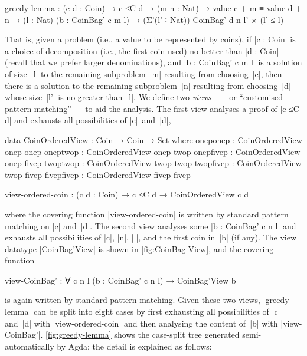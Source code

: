 \begin{code}greedy-lemma :
  (c d : Coin) → c ≤C d →
  (m n : Nat) → value c + m ≡ value d + n →
  (l : Nat) (b : CoinBag' c m l) →
  (Σ'(l' ∶ Nat)) CoinBag' d n l' × (l' ≤ l)
\end{code}That is, given a problem (i.e., a value to be represented by coins), if |c : Coin| is a choice of decomposition (i.e., the first coin used) no better than |d : Coin| (recall that we prefer larger denominations), and |b : CoinBag' c m l| is a solution of size~|l| to the remaining subproblem~|m| resulting from choosing~|c|, then there is a solution to the remaining subproblem~|n| resulting from choosing~|d| whose size~|l'| is no greater than~|l|.
We define two \emph{views}~\cite{McBride-view} --- or ``customised pattern matching'' --- to aid the analysis.
The first view analyses a proof of |c ≤C d| and exhausts all possibilities of |c|~and~|d|,
\begin{code}data CoinOrderedView : Coin → Coin → Set where
  oneponep    :  CoinOrderedView  onep   onep
  oneptwop    :  CoinOrderedView  onep   twop
  onepfivep   :  CoinOrderedView  onep   fivep
  twoptwop    :  CoinOrderedView  twop   twop
  twopfivep   :  CoinOrderedView  twop   fivep
  fivepfivep  :  CoinOrderedView  fivep  fivep

view-ordered-coin :
  (c d : Coin) → c ≤C d → CoinOrderedView c d
\end{code}where the covering function |view-ordered-coin| is written by standard pattern matching on |c| and~|d|.
The second view analyses some |b : CoinBag' c n l| and exhausts all possibilities of |c|, |n|, |l|, and the first coin in~|b| (if any).
The view datatype |CoinBag'View| is shown in \autoref{fig:CoinBag'View}, and the covering function
\begin{code}
view-CoinBag' :
  ∀ {c n l} (b : CoinBag' c n l) → CoinBag'View b
\end{code}
is again written by standard pattern matching.
Given these two views, |greedy-lemma| can be split into eight cases by first exhausting all possibilities of |c| and~|d| with |view-ordered-coin| and then analysing the content of~|b| with |view-CoinBag'|.
\autoref{fig:greedy-lemma} shows the case-split tree generated semi-automatically by Agda; the detail is explained as follows:
